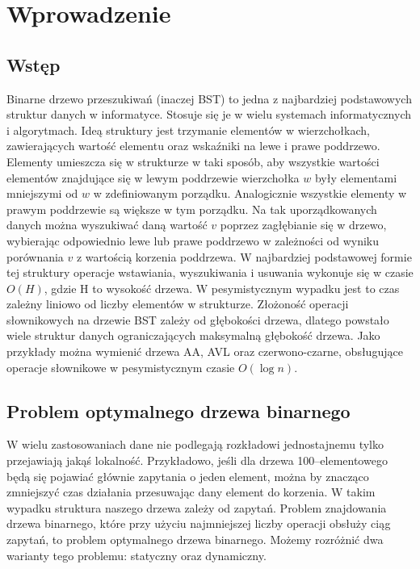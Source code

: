 \documentclass[declaration,shortabstract]{iithesis}
\author         {Julia Majkowska}
\theoremstyle{thm}
\theoremstyle{remark}
\theoremstyle{plain}
\theoremstyle{plain}
\theoremstyle{plain}
\begin{document}

  

\chapter{Wprowadzenie}   

\section{Wstęp}   

Binarne drzewo przeszukiwań (inaczej BST) to jedna z najbardziej podstawowych struktur danych w informatyce. Stosuje się je w wielu systemach informatycznych i algorytmach. Ideą struktury jest trzymanie elementów w wierzchołkach, zawierających wartość elementu oraz wskaźniki na lewe i prawe poddrzewo. Elementy umieszcza się w strukturze w taki sposób, aby wszystkie wartości elementów znajdujące się w lewym poddrzewie wierzchołka \(w\) były elementami mniejszymi od \(w\) w zdefiniowanym porządku. Analogicznie wszystkie elementy w prawym poddrzewie są większe w tym porządku. Na tak uporządkowanych danych można wyszukiwać daną wartość \(v\) poprzez zagłębianie się w drzewo, wybierając odpowiednio lewe lub prawe poddrzewo w zależności od wyniku porównania \(v\) z wartością korzenia poddrzewa. W najbardziej podstawowej formie tej struktury operacje wstawiania, wyszukiwania i usuwania wykonuje się w czasie \(O(H)\), gdzie H to wysokość drzewa. W pesymistycznym wypadku jest to czas zależny liniowo od liczby elementów w strukturze. Złożoność operacji słownikowych na drzewie BST zależy od głębokości drzewa, dlatego powstało wiele struktur danych ograniczających maksymalną głębokość drzewa. Jako przykłady można wymienić drzewa AA, AVL oraz czerwono-czarne, obsługujące operacje słownikowe w pesymistycznym czasie \(O(\log n)\).   

 

\section{Problem optymalnego drzewa binarnego}   

W wielu zastosowaniach dane nie podlegają rozkładowi jednostajnemu tylko przejawiają jakąś lokalność. Przykładowo, jeśli dla drzewa 100--elementowego będą się pojawiać głównie zapytania o jeden element, można by znacząco zmniejszyć czas działania przesuwając dany element do korzenia. W takim wypadku struktura naszego drzewa zależy od zapytań. Problem znajdowania drzewa binarnego, które przy użyciu najmniejszej liczby operacji obsłuży ciąg zapytań, to problem optymalnego drzewa binarnego. Możemy rozróżnić dwa warianty tego problemu: statyczny oraz dynamiczny.   
\end{document}
